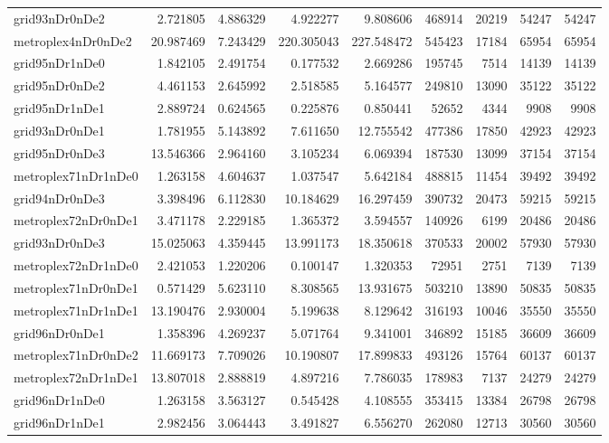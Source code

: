 \begin{longtable}{|l|r|r|r|r|r|r|r|r|}
grid93nDr0nDe2 & 2.721805 & 4.886329 & 4.922277 & 9.808606 & 468914 & 20219 & 54247 & 54247 \\
metroplex4nDr0nDe2 & 20.987469 & 7.243429 & 220.305043 & 227.548472 & 545423 & 17184 & 65954 & 65954 \\
grid95nDr1nDe0 & 1.842105 & 2.491754 & 0.177532 & 2.669286 & 195745 & 7514 & 14139 & 14139 \\
grid95nDr0nDe2 & 4.461153 & 2.645992 & 2.518585 & 5.164577 & 249810 & 13090 & 35122 & 35122 \\
grid95nDr1nDe1 & 2.889724 & 0.624565 & 0.225876 & 0.850441 & 52652 & 4344 & 9908 & 9908 \\
grid93nDr0nDe1 & 1.781955 & 5.143892 & 7.611650 & 12.755542 & 477386 & 17850 & 42923 & 42923 \\
grid95nDr0nDe3 & 13.546366 & 2.964160 & 3.105234 & 6.069394 & 187530 & 13099 & 37154 & 37154 \\
metroplex71nDr1nDe0 & 1.263158 & 4.604637 & 1.037547 & 5.642184 & 488815 & 11454 & 39492 & 39492 \\
grid94nDr0nDe3 & 3.398496 & 6.112830 & 10.184629 & 16.297459 & 390732 & 20473 & 59215 & 59215 \\
metroplex72nDr0nDe1 & 3.471178 & 2.229185 & 1.365372 & 3.594557 & 140926 & 6199 & 20486 & 20486 \\
grid93nDr0nDe3 & 15.025063 & 4.359445 & 13.991173 & 18.350618 & 370533 & 20002 & 57930 & 57930 \\
metroplex72nDr1nDe0 & 2.421053 & 1.220206 & 0.100147 & 1.320353 & 72951 & 2751 & 7139 & 7139 \\
metroplex71nDr0nDe1 & 0.571429 & 5.623110 & 8.308565 & 13.931675 & 503210 & 13890 & 50835 & 50835 \\
metroplex71nDr1nDe1 & 13.190476 & 2.930004 & 5.199638 & 8.129642 & 316193 & 10046 & 35550 & 35550 \\
grid96nDr0nDe1 & 1.358396 & 4.269237 & 5.071764 & 9.341001 & 346892 & 15185 & 36609 & 36609 \\
metroplex71nDr0nDe2 & 11.669173 & 7.709026 & 10.190807 & 17.899833 & 493126 & 15764 & 60137 & 60137 \\
metroplex72nDr1nDe1 & 13.807018 & 2.888819 & 4.897216 & 7.786035 & 178983 & 7137 & 24279 & 24279 \\
grid96nDr1nDe0 & 1.263158 & 3.563127 & 0.545428 & 4.108555 & 353415 & 13384 & 26798 & 26798 \\
grid96nDr1nDe1 & 2.982456 & 3.064443 & 3.491827 & 6.556270 & 262080 & 12713 & 30560 & 30560 \\

\end{longtable}
